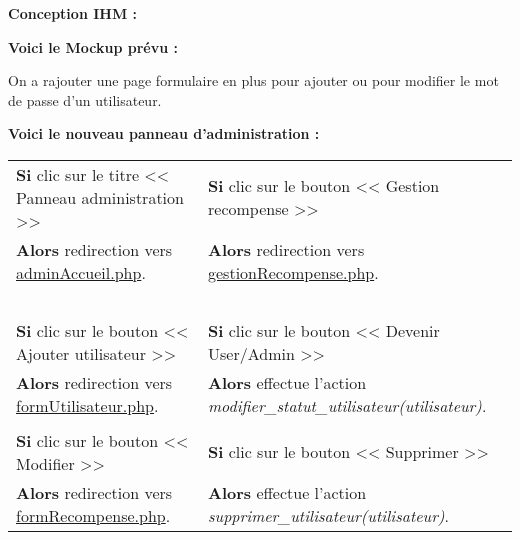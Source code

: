 			\begin{paragraphe}
				\textbf{Conception IHM :}
			\end{paragraphe}

            \begin{paragraphe}
                \textbf{Voici le Mockup prévu :}
            \end{paragraphe}


        \clearpage
    
            \begin{paragraphe}
                On a rajouter une page formulaire en plus pour ajouter ou pour modifier le mot de passe d'un utilisateur.
            \end{paragraphe}
            
            \begin{paragraphe}
                \textbf{Voici le nouveau panneau d'administration :}
            \end{paragraphe}

            \begin{center}
                \begin{tabular}{l | l}
                    \textbf{Si} clic sur le titre << Panneau administration >> & \textbf{Si} clic sur le bouton << Gestion recompense >> \\
                    \textbf{Alors} redirection vers \underline{adminAccueil.php}. & \textbf{Alors} redirection vers \underline{gestionRecompense.php}. \\ \\

                    \textbf{Si} clic sur le bouton << Ajouter utilisateur >> & \textbf{Si} clic sur le bouton << Devenir User/Admin >> \\
                    \textbf{Alors} redirection vers \underline{formUtilisateur.php}. & \textbf{Alors} effectue l'action \emph{modifier\_statut\_utilisateur(utilisateur)}. \\ \\

                    \textbf{Si} clic sur le bouton << Modifier >> & \textbf{Si} clic sur le bouton << Supprimer >> \\
                    \textbf{Alors} redirection vers \underline{formRecompense.php}. & \textbf{Alors} effectue l'action \emph{supprimer\_utilisateur(utilisateur)}.
                \end{tabular}
            \end{center}
            
